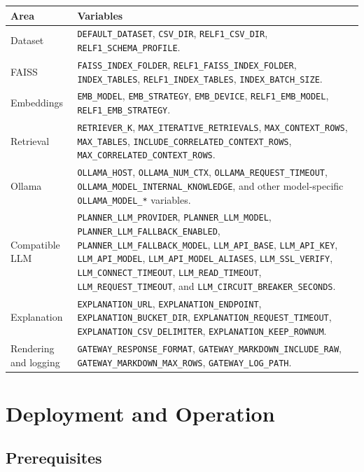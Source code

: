 \documentclass[11pt,a4paper]{article}
\newcommand{\code}[1]{\texttt{#1}}
\begin{document}
\begin{longtable}{>{\raggedright\arraybackslash}p{} >{\raggedright\arraybackslash}p{}}
\toprule
\textbf{Area} & \textbf{Variables} \\
\midrule
\endhead
Dataset & \code{DEFAULT\_DATASET}, \code{CSV\_DIR}, \code{RELF1\_CSV\_DIR}, \code{RELF1\_SCHEMA\_PROFILE}. \\
FAISS & \code{FAISS\_INDEX\_FOLDER}, \code{RELF1\_FAISS\_INDEX\_FOLDER}, \code{INDEX\_TABLES}, \code{RELF1\_INDEX\_TABLES}, \code{INDEX\_BATCH\_SIZE}. \\
Embeddings & \code{EMB\_MODEL}, \code{EMB\_STRATEGY}, \code{EMB\_DEVICE}, \code{RELF1\_EMB\_MODEL}, \code{RELF1\_EMB\_STRATEGY}. \\
Retrieval & \code{RETRIEVER\_K}, \code{MAX\_ITERATIVE\_RETRIEVALS}, \code{MAX\_CONTEXT\_ROWS}, \code{MAX\_TABLES}, \code{INCLUDE\_CORRELATED\_CONTEXT\_ROWS}, \code{MAX\_CORRELATED\_CONTEXT\_ROWS}. \\
Ollama & \code{OLLAMA\_HOST}, \code{OLLAMA\_NUM\_CTX}, \code{OLLAMA\_REQUEST\_TIMEOUT}, \code{OLLAMA\_MODEL\_INTERNAL\_KNOWLEDGE}, and other model-specific \code{OLLAMA\_MODEL\_*} variables. \\
Compatible LLM & \code{PLANNER\_LLM\_PROVIDER}, \code{PLANNER\_LLM\_MODEL}, \code{PLANNER\_LLM\_FALLBACK\_ENABLED}, \code{PLANNER\_LLM\_FALLBACK\_MODEL}, \code{LLM\_API\_BASE}, \code{LLM\_API\_KEY}, \code{LLM\_API\_MODEL}, \code{LLM\_API\_MODEL\_ALIASES}, \code{LLM\_SSL\_VERIFY}, \code{LLM\_CONNECT\_TIMEOUT}, \code{LLM\_READ\_TIMEOUT}, \code{LLM\_REQUEST\_TIMEOUT}, and \code{LLM\_CIRCUIT\_BREAKER\_SECONDS}. \\
Explanation & \code{EXPLANATION\_URL}, \code{EXPLANATION\_ENDPOINT}, \code{EXPLANATION\_BUCKET\_DIR}, \code{EXPLANATION\_REQUEST\_TIMEOUT}, \code{EXPLANATION\_CSV\_DELIMITER}, \code{EXPLANATION\_KEEP\_ROWNUM}. \\
Rendering and logging & \code{GATEWAY\_RESPONSE\_FORMAT}, \code{GATEWAY\_MARKDOWN\_INCLUDE\_RAW}, \code{GATEWAY\_MARKDOWN\_MAX\_ROWS}, \code{GATEWAY\_LOG\_PATH}. \\
\bottomrule
\end{longtable}

\section{Deployment and Operation}

\subsection{Prerequisites}
\end{document}
